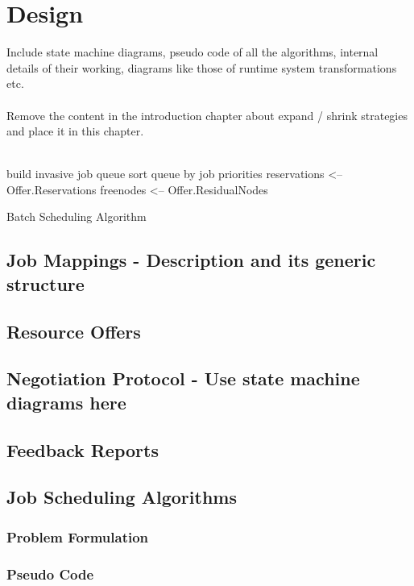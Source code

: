 \chapter{Design}
\label{chapter:ischeduler}
Include state machine diagrams, pseudo code of all the algorithms, internal details of their working, diagrams like those of runtime system transformations etc.\\ \\
Remove the content in the introduction chapter about expand / shrink strategies and place it in this chapter.\\ \\
\begin{algorithm}[H]
 build invasive job queue\;
 sort queue by job priorities\;
 reservations <-- Offer.Reservations\;
 freenodes <-- Offer.ResidualNodes\;
 \caption{Batch Scheduling Algorithm}
\end{algorithm}
\section{Job Mappings - Description and its generic structure}
\section{Resource Offers}
\section{Negotiation Protocol - Use state machine diagrams here}
\section{Feedback Reports}
\section{Job Scheduling Algorithms}
\subsection{Problem Formulation}
\subsection{Pseudo Code}
